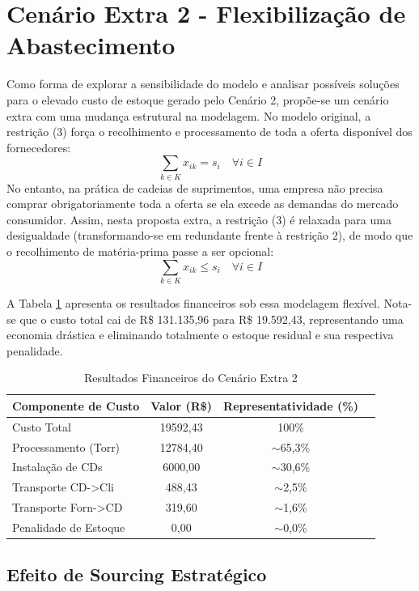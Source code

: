 \documentclass[a4paper,11pt]{article}
\begin{document}
\section{Cenário Extra 2 - Flexibilização de Abastecimento}

Como forma de explorar a sensibilidade do modelo e analisar possíveis soluções para o elevado custo de estoque gerado pelo Cenário 2, propõe-se um cenário extra com uma mudança estrutural na modelagem. No modelo original, a restrição (3) força o recolhimento e processamento de toda a oferta disponível dos fornecedores:
\[
\sum_{k \in K} x_{ik} = s_i \quad \forall i \in I
\]
No entanto, na prática de cadeias de suprimentos, uma empresa não precisa comprar obrigatoriamente toda a oferta se ela excede as demandas do mercado consumidor. Assim, nesta proposta extra, a restrição (3) é relaxada para uma desigualdade (transformando-se em redundante frente à restrição 2), de modo que o recolhimento de matéria-prima passe a ser opcional:
\[
\sum_{k \in K} x_{ik} \le s_i \quad \forall i \in I
\]

A Tabela \ref{tab:cenario2_extra_custos} apresenta os resultados financeiros sob essa modelagem flexível. Nota-se que o custo total cai de R\$ 131.135,96 para R\$ 19.592,43, representando uma economia drástica e eliminando totalmente o estoque residual e sua respectiva penalidade.

\begin{table}[H]
\centering
\begin{tabular}{lccc}
\hline
\textbf{Componente de Custo} & \textbf{Valor (R\$)} & \textbf{Representatividade (\%)} \\ \hline
Custo Total             & 19592,43  & 100\%     \\
Processamento (Torr)    & 12784,40  & $\sim$65,3\%  \\
Instalação de CDs       &  6000,00  & $\sim$30,6\%  \\
Transporte CD->Cli      &   488,43  & $\sim$2,5\%  \\
Transporte Forn->CD     &   319,60  & $\sim$1,6\%  \\
Penalidade de Estoque   &     0,00  & $\sim$0,0\%    \\
\hline
\end{tabular}
\caption{Resultados Financeiros do Cenário Extra 2}
\label{tab:cenario2_extra_custos}
\end{table}

\subsection{Efeito de Sourcing Estratégico}
\end{document}

